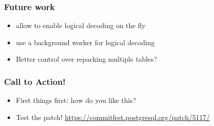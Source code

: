 \begin{frame}
  \frametitle{Future work}
  \begin{itemize}
    \item allow to enable logical decoding on the fly
    \item use a background worker for logical decoding
    \item Better control over repacking multiple tables?
  \end{itemize}
\end{frame}

\begin{frame}
  \frametitle{Call to Action!}

  \begin{itemize}
    \item First things first: how do you like this?
    \item Test the patch! \href{https://commitfest.postgresql.org/patch/5117/}{https://commitfest.postgresql.org/patch/5117/}
  \end{itemize}
\end{frame}
